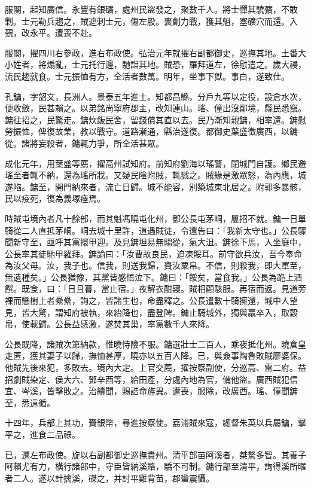 \begin{pinyinscope}
服闋，起知廣信。永豐有銀礦，處州民盜發之，聚數千人。將士憚其驍彍，不敢剿。士元勒兵趨之，賊遮刺士元，傷左股。裹創力戰，獲其魁，塞礦穴而還。入覲，改永平。遭喪不赴。

服闋，擢四川右參政，進右布政使。弘治元年就擢右副都御史，巡撫其地。土番大小姓者，將煽亂，士元托行邊，馳詣其地。賊恐，羅拜道左，徐慰遣之。歲大祲，流民趨就食。士元振恤有方，全活者數萬。明年，坐事下獄。事白，遂致仕。

孔鏞，字韶文，長洲人。景泰五年進士。知都昌縣，分戶九等以定役，設倉水次，便收斂，民甚賴之。以弟銘尚寧府郡主，改知連山。瑤、僮出沒鄰境，縣民悉竄。鏞往招之，民驚走。鏞炊飯民舍，留錢償其直以去。民乃漸知親鏞，相率還。鏞慰勞振恤，俾復故業，教以戰守。道路漸通，縣治遂復。都御史葉盛徵廣西，以鏞從。諸將妄殺者，鏞輒力爭，所全活甚眾。

成化元年，用葉盛等薦，擢高州試知府。前知府劉海以瑤警，閉城門自護。鄉民避瑤至者輒不納，還為瑤所戕。又疑民陰附賊，輒戮之。賊緣是激眾怒，為內應，城遂陷。鏞至，開門納來者，流亡日歸。城不能容，別築城東北居之。附郭多暴骸，民以疫死，復為義塚瘞焉。

時賊屯境內者凡十餘部，而其魁馮曉屯化州，鄧公長屯茅峒，屢招不就。鏞一日單騎從二人直抵茅峒。峒去城十里許，道遇賊徒，令還告曰：「我新太守也。」公長驟聞新守至，亟呼其黨擐甲迎。及見鏞坦易無騶從，氣大沮。鏞徐下馬，入坐庭中，公長率其徒馳甲羅拜。鏞諭曰：「汝曹故良民，迫凍餒耳。前守欲兵汝，吾今奉命為汝父母。汝，我子也。信我，則送我歸，賚汝粟帛。不信，則殺我，即大軍至，無遺種矣。」公長猶豫，其黨皆感悟泣下。鏞曰：「餒矣，當食我。」公長為跪上酒饌。既食，曰：「日且暮，當止宿。」夜解衣酣寢。賊相顧駭服。再宿而返。見道旁裸而懸樹上者纍纍，詢之，皆諸生也，命盡釋之。公長遣數十騎擁還，城中人望見，皆大驚，謂知府被執，來紿降也，盡登陴。鏞止騎城外，獨與羸卒入，取穀帛，使載歸。公長益感激，遂焚其巢，率黨數千人來降。

公長既降，諸賊次第納款，惟曉恃險不服。鏞選壯士二百人，乘夜抵化州。曉倉皇走匿，獲其妻子以歸，撫恤甚厚，曉亦以五百人降。已，與僉事陶魯敗賊廖婆保。他賊先後來犯，多敗去。境內大定。上官交薦，擢按察副使，分巡高、雷二府。益招劇賊染定、侯大六、鄧辛酉等，給田產，分處內地為官，備他盜。廣西賊犯信宜、岑溪，皆擊敗之。治績聞，賜誥命旌異。遭喪，服除，改廣西。瑤、僮聞鏞至，悉遠循。

十四年，兵部上其功，賚銀幣，尋進按察使。荔浦賊來寇，總督朱英以兵屬鏞，擊平之，進食二品祿。

已，遷左布政使。旋以右副都御史巡撫貴州。清平部苗阿溪者，桀驁多智。其養子阿賴尤有力，橫行諸部中，守臣皆納溪賂，驕不可制。鏞行部至清平，詢得溪所暱者二人。遂以計擒溪，磔之，并討平雞背苗，郡蠻震懾。


\end{pinyinscope}

